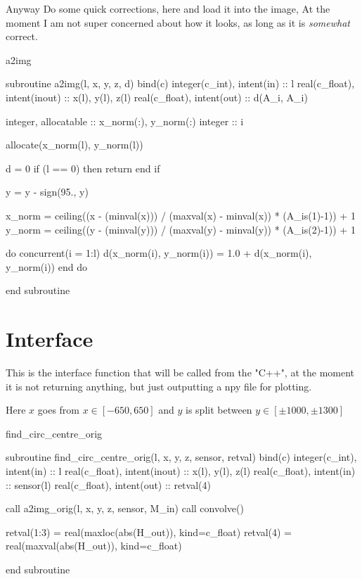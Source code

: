 \documentclass[10pt, a4paper]{article}
\begin{document}
Anyway Do some quick corrections, here and load it into the image, At the moment I am not super concerned about how it looks, as long as it is \emph{somewhat} correct. 

\begin{codeblock}{a2img}
\begin{code}
subroutine a2img(l, x, y, z, d) bind(c)
	integer(c_int), intent(in)  :: l
	real(c_float),  intent(inout)  :: x(l), y(l), z(l)
	real(c_float),  intent(out) :: d(A_i, A_i)
	
	integer, allocatable :: x_norm(:), y_norm(:)
	integer :: i
	
	allocate(x_norm(l), y_norm(l))
	
	d = 0
	if (l == 0) then 
		return 
	end if 
	
	y = y - sign(95., y)
	
	x_norm = ceiling((x - (minval(x))) / (maxval(x) - minval(x)) * (A_is(1)-1)) + 1 
	y_norm = ceiling((y - (minval(y))) / (maxval(y) - minval(y)) * (A_is(2)-1)) + 1
	
	do concurrent(i = 1:l)
		d(x_norm(i), y_norm(i)) = 1.0 + d(x_norm(i), y_norm(i))
	end do
	
end subroutine
\end{code}
\end{codeblock}

\section{Interface}

This is the interface function that will be called from the "C++", at the moment it is not returning anything, but just outputting a npy file for plotting.

Here $x$ goes from $x\in[-650, 650]$ and $y$ is split between $y \in [\pm1000, \pm1300]$

\begin{codeblock}{find_circ_centre_orig}
\begin{code}
subroutine find_circ_centre_orig(l, x, y, z, sensor, retval) bind(c)
	integer(c_int), intent(in)  :: l
	real(c_float),  intent(inout)  :: x(l), y(l), z(l)
	real(c_float),  intent(in)  :: sensor(l)
	real(c_float),  intent(out) :: retval(4)
	
	call a2img_orig(l, x, y, z, sensor, M_in)
	call convolve()
	
	retval(1:3) = real(maxloc(abs(H_out)), kind=c_float)
	retval(4) = real(maxval(abs(H_out)), kind=c_float)
	
end subroutine
\end{code}
\end{codeblock}
\end{document}
